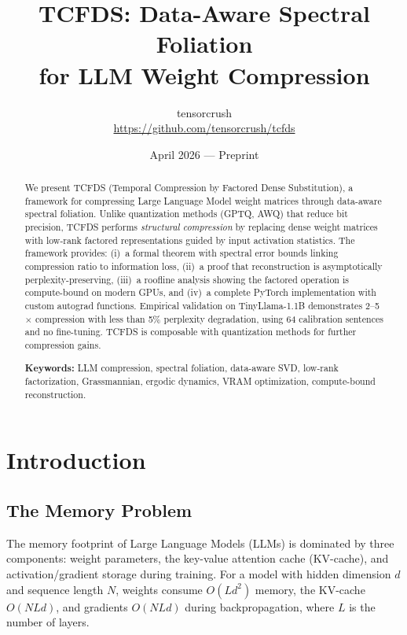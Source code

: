 \documentclass[11pt,a4paper]{article}
\title{\textbf{TCFDS: Data-Aware Spectral Foliation\\for LLM Weight Compression}}
\author{tensorcrush\\[4pt]\small\url{https://github.com/tensorcrush/tcfds}}
\date{April 2026 --- Preprint}
\begin{document}
\maketitle

\begin{abstract}
We present TCFDS (Temporal Compression by Factored Dense Substitution), a framework for compressing Large Language Model weight matrices through data-aware spectral foliation. Unlike quantization methods (GPTQ, AWQ) that reduce bit precision, TCFDS performs \emph{structural compression} by replacing dense weight matrices with low-rank factored representations guided by input activation statistics. The framework provides: (i)~a formal theorem with spectral error bounds linking compression ratio to information loss, (ii)~a proof that reconstruction is asymptotically perplexity-preserving, (iii)~a roofline analysis showing the factored operation is compute-bound on modern GPUs, and (iv)~a complete PyTorch implementation with custom autograd functions. Empirical validation on TinyLlama-1.1B demonstrates 2--5$\times$ compression with less than 5\% perplexity degradation, using 64 calibration sentences and no fine-tuning. TCFDS is composable with quantization methods for further compression gains.

\medskip
\noindent\textbf{Keywords:} LLM compression, spectral foliation, data-aware SVD, low-rank factorization, Grassmannian, ergodic dynamics, VRAM optimization, compute-bound reconstruction.
\end{abstract}

\section{Introduction}

\subsection{The Memory Problem}

The memory footprint of Large Language Models (LLMs) is dominated by three components: weight parameters, the key-value attention cache (KV-cache), and activation/gradient storage during training. For a model with hidden dimension $d$ and sequence length $N$, weights consume $O(Ld^2)$ memory, the KV-cache $O(NLd)$, and gradients $O(NLd)$ during backpropagation, where $L$ is the number of layers.
\end{document}
